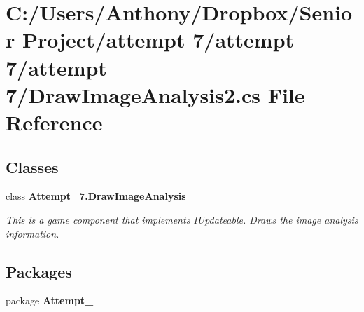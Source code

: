 \section{C:/Users/Anthony/Dropbox/Senior Project/attempt 7/attempt 7/attempt 7/DrawImageAnalysis2.cs File Reference}
\label{_draw_image_analysis2_8cs}
\subsection*{Classes}
\begin{DoxyCompactItemize}
\item 
class {\bf Attempt\_\-7.DrawImageAnalysis}
\begin{DoxyCompactList}\small\item\em This is a game component that implements IUpdateable. Draws the image analysis information. \item\end{DoxyCompactList}\end{DoxyCompactItemize}
\subsection*{Packages}
\begin{DoxyCompactItemize}
\item 
package {\bf Attempt\_}
\end{DoxyCompactItemize}
